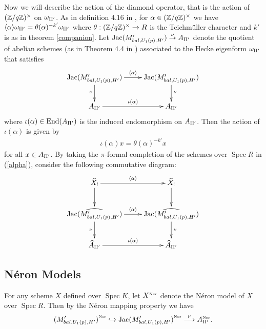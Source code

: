 \documentclass{amsart}
\newcommand{\inj}{\hookrightarrow}
\numberwithin{equation}{section}
\def \mb{\mbox}
\newcommand{\Cs}{M'_{bal,U_1(p),H'}}
\newcommand{\Jac}{\mb{Jac}(\Cs)}
\newcommand{\ner}{\mb{\tiny Ner}}
\DeclareMathOperator{\Spec}{\mathrm{Spec}}
\newcommand{\End}{\mathrm{End}}
\begin{document}
Now we will describe the action of the diamond operator, that is the 
action of $(\mathbb{Z}/ q\mathbb{Z})^\times$ on $\omega_{\Pi'}$.
As in definition $4.16$ in \cite{MR2357747}, for $\alpha \in (\mathbb{Z}/q\mathbb{Z})^\times$ 
we have $\langle \alpha \rangle \omega_{\Pi'} = 
\theta(\alpha)^{-k'}
\omega_{\Pi'}$ where $\theta: (\mathbb{Z}/q \mathbb{Z})^\times \rightarrow 
R$ is the Teichm{\"u}ller character and $k'$ is as in theorem
\ref{companion}. Let $\Jac \stk{\nu}{\map} A_{\pip'}$ 
denote the quotient of abelian schemes (as in Theorem 4.4 in \cite{MR623136}) 
associated to the Hecke eigenform $\omega_{\Pi'}$ that satisfies  
\begin{align}
\label{alpha}
\xymatrix{
\Jac \ar[d]_\nu \ar[r]^{\langle \alpha \rangle} & \Jac \ar[d]^\nu \\
A_{\pip'} \ar[r]^{\iota(\alpha)} & A_{\pip'}
}
\end{align}
where $\iota(\alpha) \in \End(A_{\pip'})$ is the induced endomorphism on 
$A_{\Pi'}$.
Then the action of $\iota(\alpha)$ is given by
\begin{align}
\iota(\alpha) x = \theta(\alpha)^{-k'} x
\end{align}
for all $x \in A_{\Pi'}$. By taking the $\pi$-formal completion of the schemes 
over $\Spec R$ in (\ref{alpha}), consider the following commutative diagram: 
\begin{align}
\label{nu}
\xymatrix{
\wh{X}_! \ar[d] \ar[r]^{\langle \alpha \rangle} &\wh{X}_! \ar[d] \\
\wh{\Jac} \ar[d]_\nu \ar[r]^{\langle \alpha \rangle} & \wh{\Jac} \ar[d]^\nu \\
\wh{A}_{\pip'} \ar[r]^{\iota(\alpha)} & \wh{A}_{\pip'}
}
\end{align}



\subsection{N\'{e}ron Models}
\label{neron}
For any scheme $X$ defined over $\Spec K$, let $\Ner{X}$ denote 
the N\'{e}ron model of $X$ over $\Spec R$. Then by the N\'{e}ron mapping 
property we have 
\begin{align}
\Ner{(\Mu)} \inj  \Ner{\Jac} \stk{\nu}{\longrightarrow} A_{\pip'}^{\ner}.
\end{align} 
\end{document}

